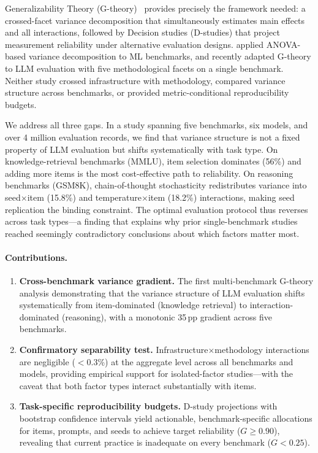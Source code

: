 \documentclass[11pt]{article}
\newcommand{\pp}{\,\text{pp}}
\begin{document}
Generalizability Theory (G-theory)~\citep{brennan2001generalizability,shavelson1991generalizability} provides precisely the framework needed: a crossed-facet variance decomposition that simultaneously estimates main effects and all interactions, followed by Decision studies (D-studies) that project measurement reliability under alternative evaluation designs.
\citet{bouthillier2021accounting} applied ANOVA-based variance decomposition to ML benchmarks, and \citet{mesting2026gtheory} recently adapted G-theory to LLM evaluation with five methodological facets on a single benchmark.
Neither study crossed infrastructure with methodology, compared variance structure across benchmarks, or provided metric-conditional reproducibility budgets.

We address all three gaps.
In a study spanning five benchmarks, six models, and over 4 million evaluation records, we find that variance structure is not a fixed property of LLM evaluation but shifts systematically with task type.
On knowledge-retrieval benchmarks (MMLU), item selection dominates (56\%) and adding more items is the most cost-effective path to reliability.
On reasoning benchmarks (GSM8K), chain-of-thought stochasticity redistributes variance into seed$\times$item (15.8\%) and temperature$\times$item (18.2\%) interactions, making seed replication the binding constraint.
The optimal evaluation protocol thus reverses across task types---a finding that explains why prior single-benchmark studies reached seemingly contradictory conclusions about which factors matter most.

\paragraph{Contributions.}
\begin{enumerate}
\item \textbf{Cross-benchmark variance gradient.} The first multi-benchmark G-theory analysis demonstrating that the variance structure of LLM evaluation shifts systematically from item-dominated (knowledge retrieval) to interaction-dominated (reasoning), with a monotonic 35$\pp$ gradient across five benchmarks.
\item \textbf{Confirmatory separability test.} Infrastructure$\times$methodology interactions are negligible ($<$0.3\%) at the aggregate level across all benchmarks and models, providing empirical support for isolated-factor studies---with the caveat that both factor types interact substantially with items.
\item \textbf{Task-specific reproducibility budgets.} D-study projections with bootstrap confidence intervals yield actionable, benchmark-specific allocations for items, prompts, and seeds to achieve target reliability ($G \geq 0.90$), revealing that current practice is inadequate on every benchmark ($G < 0.25$).
\end{enumerate}
\end{document}
